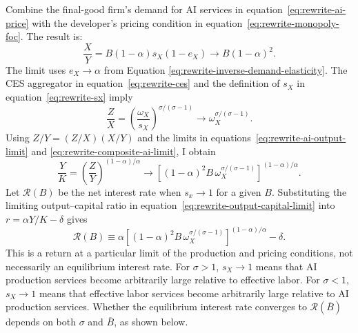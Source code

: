 Combine the final-good firm's demand for AI services in
equation~\eqref{eq:rewrite-ai-price} with the developer's pricing condition in equation~\eqref{eq:rewrite-monopoly-foc}. The result is:
\begin{equation}
 \frac XY=B(1-\alpha)s_X(1-e_X)
 \longrightarrow B(1-\alpha)^2.
 \label{eq:rewrite-ai-output-limit}
\end{equation}
The limit uses $e_X\to\alpha$ from Equation
\eqref{eq:rewrite-inverse-demand-elasticity}. %
The CES aggregator in equation~\eqref{eq:rewrite-ces} and the definition of
$s_X$ in equation~\eqref{eq:rewrite-sx} imply
\begin{equation}
 \frac ZX=\left(\frac{\omega_X}{s_X}\right)^{\sigma/(\sigma-1)}
 \longrightarrow\omega_X^{\sigma/(\sigma-1)}.
 \label{eq:rewrite-composite-ai-limit}
\end{equation}
Using $Z/Y=(Z/X)(X/Y)$ and the limits
in equations~\eqref{eq:rewrite-ai-output-limit} and
\eqref{eq:rewrite-composite-ai-limit}, I obtain
\begin{equation}
 \frac YK=\left(\frac ZY\right)^{(1-\alpha)/\alpha}
 \longrightarrow
 \left[(1-\alpha)^2B\,\omega_X^{\sigma/(\sigma-1)}\right]^{(1-\alpha)/\alpha}.
 \label{eq:rewrite-output-capital-limit}
\end{equation}
Let $\mathcal R(B)$ be the net interest rate when $s_x \to 1$ for a given $B$. Substituting the limiting output--capital ratio in
equation~\eqref{eq:rewrite-output-capital-limit} into $r=\alpha Y/K-\delta$ gives
\begin{equation}
 \mathcal R(B)
 \equiv\alpha\left[(1-\alpha)^2B\,
 \omega_X^{\sigma/(\sigma-1)}\right]^{(1-\alpha)/\alpha}-\delta.
 \label{eq:rewrite-ai-terminal-ratio}
\end{equation}
This is a return at a particular limit of the production and pricing conditions, not necessarily an equilibrium interest rate. %
For $\sigma>1$, $s_X\to1$ means that AI production services become arbitrarily large relative to effective labor. For $\sigma<1$, $s_X\to1$ means that effective labor services become arbitrarily large relative to AI production services. Whether the equilibrium interest rate converges to $\mathcal R(\overline B)$ depends on both $\sigma$ and $\overline B$, as shown below.

